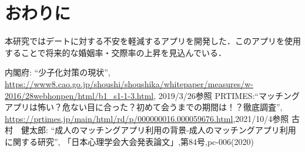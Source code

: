 \documentclass[twocolumn,10pt,a4j]{ltjsarticle}
\begin{document}
\section{おわりに}
本研究ではデートに対する不安を軽減するアプリを開発した．このアプリを使用することで将来的な婚姻率・交際率の上昇を見込んでいる．

\begin{thebibliography}{99}
 内閣府: ``少子化対策の現状'', \url{https://www8.cao.go.jp/shoushi/shoushika/whitepaper/measures/w-2016/28webhonpen/html/b1_s1-1-3.html}, 2019/3/26参照
PRTIMES:``マッチングアプリは怖い？危ない目に合った？初めて会うまでの期間は！？徹底調査'',
\url{https://prtimes.jp/main/html/rd/p/000000016.000059676.html},2021/10/4参照
 古村　健太郎: ``成人のマッチングアプリ利用の背景-成人のマッチングアプリ利用に関する研究'', 「日本心理学会大会発表論文」,第84号,pc-006(2020)

\end{thebibliography}
\end{document}
